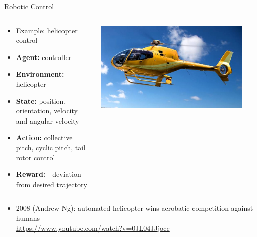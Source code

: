 \documentclass[11pt,table]{beamer}
\begin{document}
\begin{frame}{Robotic Control}
    \begin{columns}[T]
\begin{column}{0.5\textwidth}
\begin{itemize}
    \item  Example: helicopter control

\item \textbf{Agent:} controller
\item \textbf{Environment:} helicopter
\item \textbf{State:} position, orientation,  velocity and angular velocity
\item \textbf{Action:} collective pitch, cyclic pitch, tail rotor control
\item \textbf{Reward:} - deviation from desired trajectory
 
\end{itemize}
\end{column}
\begin{column}{0.45\textwidth}
\centering
\includegraphics[width=0.9\textwidth]{figures/helicopter}
\end{column}
\end{columns}

\begin{itemize}
    \item  2008 (Andrew Ng): automated helicopter wins acrobatic  competition against humans\\
\url{https://www.youtube.com/watch?v=0JL04JJjocc}

\end{itemize}
\end{frame}
\end{document}

